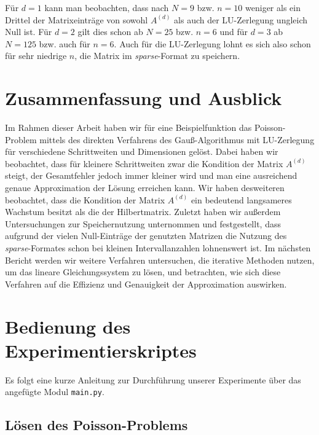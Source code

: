 \documentclass{scrartcl}
\begin{document}
Für $d=1$ kann man beobachten, dass nach $N=9$ bzw. $n=10$  weniger als ein Drittel der Matrixeinträge von sowohl $A^{(d)}$ als auch der LU-Zerlegung ungleich Null ist.
Für $d=2$ gilt dies schon ab $N=25$ bzw. $n=6$ und für $d=3$ ab $N = 125$ bzw. auch für $n=6$.
Auch für die LU-Zerlegung lohnt es sich also schon für sehr niedrige $n$, die Matrix im \textit{sparse}-Format zu speichern.

\section{Zusammenfassung und Ausblick}
Im Rahmen dieser Arbeit haben wir für eine Beispielfunktion das Poisson-Problem mittels des direkten Verfahrens des Gauß-Algorithmus mit LU-Zerlegung für verschiedene Schrittweiten und Dimensionen gelöst.
Dabei haben wir beobachtet, dass für kleinere Schrittweiten zwar die Kondition der Matrix $A^{(d)}$ steigt, der Gesamtfehler jedoch immer kleiner wird und man eine ausreichend genaue Approximation der Lösung erreichen kann.
Wir haben desweiteren beobachtet, dass die Kondition der Matrix $A^{(d)}$ ein bedeutend langsameres Wachstum besitzt als die der Hilbertmatrix.
Zuletzt haben wir außerdem Untersuchungen zur Speichernutzung unternommen und festgestellt, dass aufgrund der vielen Null-Einträge der genutzten Matrizen die Nutzung des \textit{sparse}-Formates schon bei kleinen Intervallanzahlen lohnenswert ist.
Im nächsten Bericht werden wir weitere Verfahren untersuchen, die iterative Methoden nutzen, um das lineare Gleichungssystem zu lösen, und betrachten, wie sich diese Verfahren auf die Effizienz und Genauigkeit der Approximation auswirken.

\pagebreak




\appendix

\pagebreak

\section{Bedienung des Experimentierskriptes}

Es folgt eine kurze Anleitung zur Durchführung unserer Experimente über das angefügte Modul \texttt{main.py}.

\subsection{Lösen des Poisson-Problems}
\end{document}
